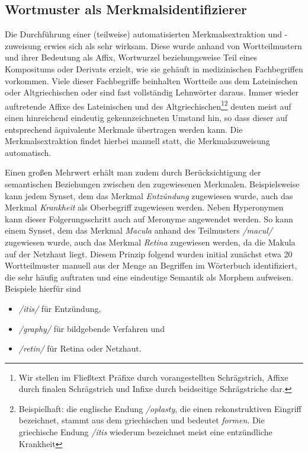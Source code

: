 \documentclass[pagesize,DIV=calc,12pt,final]{scrreprt}
\begin{document}
\subsection{Wortmuster als Merkmalsidentifizierer}

Die Durchführung einer (teilweise) automatisierten Merkmalsextraktion und -zuweisung erwies sich als sehr wirksam. 
Diese wurde anhand von Wortteilmustern und ihrer Bedeutung als Affix, Wortwurzel beziehungsweise Teil eines Kompositums oder Derivats erzielt, wie sie gehäuft in medizinischen Fachbegriffen vorkommen. 
Viele dieser Fachbegriffe beinhalten Wortteile aus dem Lateinischen oder Altgriechischen oder sind fast vollständig Lehnwörter daraus. 
Immer wieder auftretende Affixe des Lateinischen und des Altgriechischen\footnote{Wir stellen im Fließtext Präfixe durch vorangestellten Schrägstrich, Affixe durch finalen Schrägstrich und Infixe durch beidseitige Schrägstriche dar.}\footnote{Beispielhaft: die englische Endung \emph{/oplasty}, die einen rekonstruktiven Eingriff bezeichnet, stammt aus dem griechischen und bedeutet \emph{formen}. 
Die griechische Endung \emph{/itis} wiederum bezeichnet meist eine entzündliche Krankheit} deuten meist auf einen hinreichend eindeutig gekennzeichneten Umstand hin, so dass dieser auf entsprechend äquivalente Merkmale übertragen werden kann. 
Die Merkmalsextraktion findet hierbei manuell statt, die Merkmalszuweisung automatisch. 

Einen großen Mehrwert erhält man zudem durch Berücksichtigung der semantischen Beziehungen zwischen den zugewiesenen Merkmalen. 
Beispielsweise kann jedem Synset, dem das Merkmal \textit{Entzündung} zugewiesen wurde, auch das Merkmal \textit{Krankheit} als Oberbegriff zugewiesen werden. 
Neben Hyperonymen kann dieser Folgerungsschritt auch auf Meronyme angewendet werden. 
So kann einem Synset, dem das Merkmal \textit{Macula} anhand des Teilmusters \emph{/macul/} zugewiesen wurde, auch das Merkmal \textit{Retina} zugewiesen werden, da die Makula auf der Netzhaut liegt. 
Diesem Prinzip folgend wurden initial zunächst etwa 20 Wortteilmuster manuell aus der Menge an Begriffen im Wörterbuch identifiziert, die sehr häufig auftraten und eine eindeutige Semantik als Morphem aufweisen. 
Beispiele hierfür sind 

\begin{itemize}
\item
 \emph{/itis/} für Entzündung,
\item
 \emph{/graphy/} für bildgebende Verfahren und
\item
 \emph{/retin/} für Retina oder Netzhaut.
\end{itemize}
\end{document}
